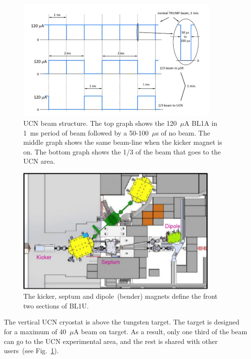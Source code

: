 \begin{figure}[h!]
  \centering
  \includegraphics[width=0.9\textwidth]{bl1u.png}
  \caption[UCN beam structure]{UCN beam structure. The top graph shows
    the 120~$\mu$A BL1A in 1~ms period of beam followed by a
    50-100~$\mu$s of no beam. The middle graph shows the same
    beam-line when the kicker magnet is on. The bottom graph shows the
    1/3 of the beam that goes to the UCN area.}
  \label{fig:bl1u}
\end{figure}



\begin{figure}[h!]
  \centering
  \includegraphics[width=0.9\textwidth]{magnets.png}
  \caption[The kicker, septum and dipole magnets]{The kicker, septum
    and dipole~(bender) magnets define the front two sections of
    BL1U.}
  \label{fig:magnets}
\end{figure}
The vertical UCN cryostat is above the tungsten target. The target is
designed for a maximum of 40~$\mu$A beam on target. As a result, only
one third of the beam can go to the UCN experimental area, and the
rest is shared with other users~(see Fig.~\ref{fig:bl1u}).



